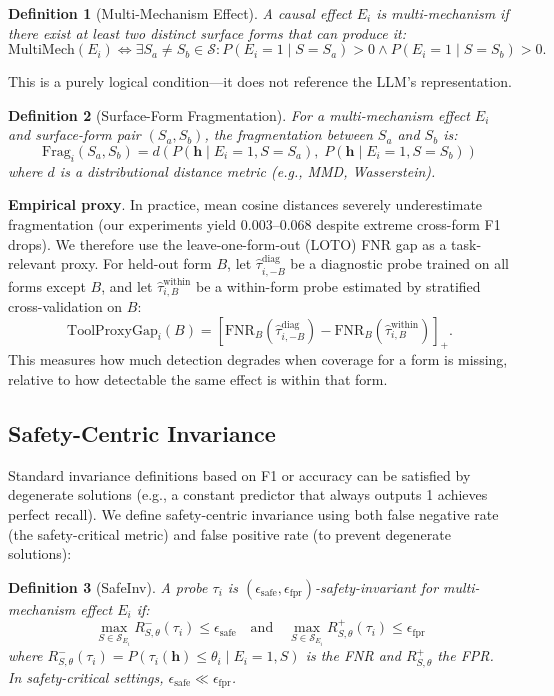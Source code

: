 \documentclass{article}
\newtheorem{definition}{Definition}[section]
\begin{document}
\begin{definition}[Multi-Mechanism Effect]
A causal effect $E_i$ is \emph{multi-mechanism} if there exist at least two distinct surface forms that can produce it:
$$\text{MultiMech}(E_i) \iff \exists S_a \neq S_b \in \mathcal{S}: P(E_i = 1 \mid S = S_a) > 0 \land P(E_i = 1 \mid S = S_b) > 0.$$
\end{definition}
This is a purely logical condition---it does not reference the LLM's representation.

\begin{definition}[Surface-Form Fragmentation]
For a multi-mechanism effect $E_i$ and surface-form pair $(S_a, S_b)$, the \emph{fragmentation} between $S_a$ and $S_b$ is:
$$\text{Frag}_i(S_a, S_b) = d\left(P(\mathbf{h} \mid E_i=1, S=S_a), \; P(\mathbf{h} \mid E_i=1, S=S_b)\right)$$
where $d$ is a distributional distance metric (e.g., MMD, Wasserstein).
\end{definition}

\textbf{Empirical proxy}. In practice, mean cosine distances severely underestimate fragmentation (our experiments yield 0.003--0.068 despite extreme cross-form F1 drops). We therefore use the leave-one-form-out (LOTO) FNR gap as a task-relevant proxy. For held-out form $B$, let $\hat{\tau}_{i,-B}^{\text{diag}}$ be a diagnostic probe trained on all forms except $B$, and let $\hat{\tau}_{i,B}^{\text{within}}$ be a within-form probe estimated by stratified cross-validation on $B$:
$$\text{ToolProxyGap}_i(B) = [\text{FNR}_B(\hat{\tau}_{i,-B}^{\text{diag}}) - \text{FNR}_B(\hat{\tau}_{i,B}^{\text{within}})]_+.$$
This measures how much detection degrades when coverage for a form is missing, relative to how detectable the same effect is within that form.

\subsection{Safety-Centric Invariance}

Standard invariance definitions based on F1 or accuracy can be satisfied by degenerate solutions (e.g., a constant predictor that always outputs 1 achieves perfect recall). We define safety-centric invariance using both false negative rate (the safety-critical metric) and false positive rate (to prevent degenerate solutions):

\begin{definition}[SafeInv]
A probe $\tau_i$ is $(\epsilon_{\text{safe}}, \epsilon_{\text{fpr}})$-\emph{safety-invariant} for multi-mechanism effect $E_i$ if:
$$\max_{S \in \mathcal{S}_{E_i}} R_{S, \theta}^{-}(\tau_i) \leq \epsilon_{\text{safe}} \quad \text{and} \quad \max_{S \in \mathcal{S}_{E_i}} R_{S, \theta}^{+}(\tau_i) \leq \epsilon_{\text{fpr}}$$
where $R_{S, \theta}^{-}(\tau_i) = P(\tau_i(\mathbf{h}) \leq \theta_i \mid E_i=1, S)$ is the FNR and $R_{S,\theta}^{+}$ the FPR. In safety-critical settings, $\epsilon_{\text{safe}} \ll \epsilon_{\text{fpr}}$.
\end{definition}
\end{document}
